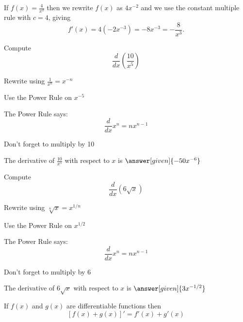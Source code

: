 \documentclass{ximera}
\begin{document}
\begin{example} %
 If $f(x) = \frac{4}{x^2}$ then we rewrite $f(x)$ as $4x^{-2}$  and we use the constant multiple rule with $c = 4$, 
giving 
\[f'(x) = 4 (-2x^{-3}) = -8x^{-3} = -\frac{8}{x^3}.
\]
\end{example}

\begin{problem} %
  Compute 
  \[
  \frac{d}{dx} \left(\frac{10}{x^5}\right)
  \]
  
    \begin{hint}
		  Rewrite using $\frac{1}{x^n} = x^{-n}$
		\end{hint}
		\begin{hint}
      Use the Power Rule on $x^{-5}$
    \end{hint}
    \begin{hint}
      The Power Rule says:
      \[
      \frac{d}{dx} x^n = nx^{n-1}
      \]
    \end{hint}
		\begin{hint}
		  Don't forget to multiply by 10
		\end{hint}
		
		The derivative of $\frac{10}{x^5}$ with respect to $x$ is
		 $\answer[given]{-50x^{-6}}$
	
\end{problem}


\begin{problem} %
  Compute 
  \[
  \frac{d}{dx} \left(6\sqrt x\right)
  \]
  
    \begin{hint}
		  Rewrite using $\sqrt[n] x = x^{1/n}$
		\end{hint}
		\begin{hint}
      Use the Power Rule on $x^{1/2}$
    \end{hint}
    \begin{hint}
      The Power Rule says:
      \[
      \frac{d}{dx} x^n = nx^{n-1}
      \]
    \end{hint}
		\begin{hint}
		  Don't forget to multiply by 6
		\end{hint}
		
		The derivative of $6\sqrt x$ with respect to $x$ is
		 $\answer[given]{3x^{-1/2}}$
	
\end{problem}


\begin{theorem} If $f(x)$ and $g(x)$ are differentiable functions then
\[[f(x) + g(x)]' =  f'(x) +  g'(x)\]
\end{theorem}
\end{document}
